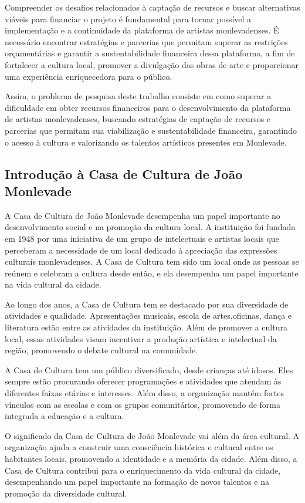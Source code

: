 Compreender os desafios relacionados à captação de recursos e buscar alternativas viáveis para financiar o projeto é fundamental para tornar possível a implementação e a continuidade da plataforma de artistas monlevadenses. É necessário encontrar estratégias e parcerias que permitam superar as restrições orçamentárias e garantir a sustentabilidade financeira dessa plataforma, a fim de fortalecer a cultura local, promover a divulgação das obras de arte e proporcionar uma experiência enriquecedora para o público.

Assim, o problema de pesquisa deste trabalho consiste em como superar a dificuldade em obter recursos financeiros para o desenvolvimento da plataforma de artistas monlevadenses, buscando estratégias de captação de recursos e parcerias que permitam sua viabilização e sustentabilidade financeira, garantindo o acesso à cultura e valorizando os talentos artísticos presentes em Monlevade.

\subsection{Introdução à Casa de Cultura de João Monlevade}
A Casa de Cultura de João Monlevade desempenha um papel importante no desenvolvimento social e na promoção da cultura local. A instituição foi fundada em 1948 por uma iniciativa de um grupo de intelectuais e artistas locais que perceberam a necessidade de um local dedicado à apreciação das expressões culturais monlevadenses. A Casa de Cultura tem sido um local onde as pessoas se reúnem e celebram a cultura desde então, e ela desempenha um papel importante na vida cultural da cidade.

Ao longo dos anos, a Casa de Cultura tem se destacado por sua diversidade de atividades e qualidade. Apresentações musicais, escola de artes,oficinas, dança e literatura estão entre as atividades da instituição. Além de promover a cultura local, essas atividades visam incentivar a produção artística e intelectual da região, promovendo o debate cultural na comunidade.

A Casa de Cultura tem um público diversificado, desde crianças até idosos. Eles sempre estão procurando oferecer programações e atividades que atendam às diferentes faixas etárias e interesses. Além disso, a organização mantém fortes vínculos com as escolas e com os grupos comunitários, promovendo de forma integrada a educação e a cultura.

O significado da Casa de Cultura de João Monlevade vai além da área cultural. A organização ajuda a construir uma consciência histórica e cultural entre os habitantes locais, promovendo a identidade e a memória da cidade. Além disso, a Casa de Cultura contribui para o enriquecimento da vida cultural da cidade, desempenhando um papel importante na formação de novos talentos e na promoção da diversidade cultural.

